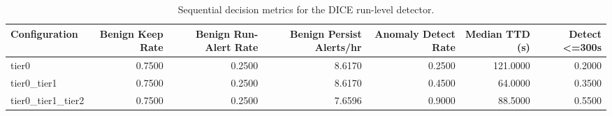 \begin{table}[t]
\centering
\caption{Sequential decision metrics for the DICE run-level detector.}
\label{tab:dice_sequential_metrics}
\footnotesize
\begin{tabular}{lrrrrrr}
\toprule
Configuration & Benign Keep Rate & Benign Run-Alert Rate & Benign Persist Alerts/hr & Anomaly Detect Rate & Median TTD (s) & Detect <=300s \\
\midrule
tier0 & 0.7500 & 0.2500 & 8.6170 & 0.2500 & 121.0000 & 0.2000 \\
tier0_tier1 & 0.7500 & 0.2500 & 8.6170 & 0.4500 & 64.0000 & 0.3500 \\
tier0_tier1_tier2 & 0.7500 & 0.2500 & 7.6596 & 0.9000 & 88.5000 & 0.5500 \\
\bottomrule
\end{tabular}

\end{table}
